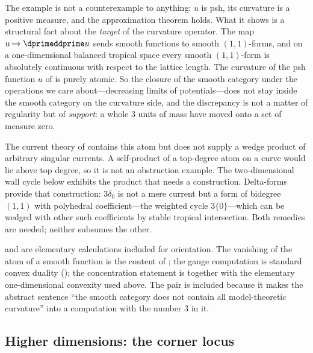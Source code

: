 \begin{remark}
\label{rem:ch18-gauge-reading}
The example is not a counterexample to anything: $u$ is psh, its curvature
is a positive measure, and the approximation theorem holds.  What it shows
is a structural fact about the \emph{target} of the curvature operator.  The
map $u\mapsto\dprimeddprime u$ sends smooth functions to smooth
$(1,1)$-forms, and on a one-dimensional balanced tropical space every smooth
$(1,1)$-form is absolutely continuous with respect to the lattice length.
The curvature of the psh function $u$ of  is purely
atomic.  So the closure of the smooth category under the operations we care
about---decreasing limits of potentials---does not stay inside the smooth
category on the curvature side, and the discrepancy is not a matter of
regularity but of \emph{support}: a whole $3$ units of mass have moved onto
a set of measure zero.

The current theory of  contains this atom but does
not supply a wedge product of arbitrary singular currents.  A self-product
of a top-degree atom on a curve would lie above top degree, so it is not an
obstruction example.  The two-dimensional wall cycle below exhibits the
product that needs a construction.  Delta-forms provide that construction:
$3\delta_0$ is not a mere current but a form of bidegree $(1,1)$ with
polyhedral coefficient---the weighted cycle $3\{0\}$---which can be wedged
with other such coefficients by stable tropical intersection.  Both remedies
are needed; neither subsumes the other.
\end{remark}

\begin{remark}[Provenance]
\label{rem:ch18-gauge-provenance}
 and  are
elementary calculations included for orientation.  The vanishing of the
atom of a smooth function is the content of ;
the gauge computation is standard convex duality
(); the concentration statement is
 together with the elementary
one-dimensional convexity used above.  The pair is included because it makes
the abstract sentence ``the smooth category does not contain all
model-theoretic curvature'' into a computation with the number $3$ in it.
\end{remark}

\subsection{Higher dimensions: the corner locus}
\label{sec:ch18-corner-locus}

